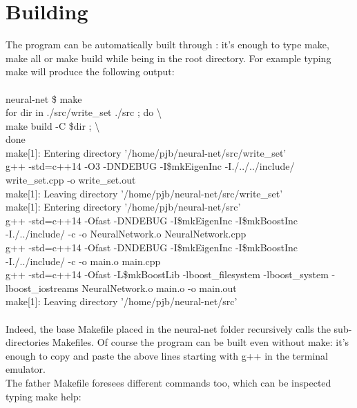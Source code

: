 \documentclass[12pt, a4paper]{report}
\theoremstyle{definition}
\begin{document}
\section{Building}
The program can be automatically built through \cite{make}: it's enough to type {\ttfamily make}, {\ttfamily make all} or {\ttfamily make build} while being in the root directory. For example typing {\ttfamily make} will produce the following output:\\
{\\ \ttfamily 
	neural-net \$ make \\
	for dir in ./src/write\_set ./src ; do \textbackslash\\
	  make build -C \$dir ; \textbackslash\\
	  done\\
	make[1]: Entering directory '/home/pjb/neural-net/src/write\_set'\\
	g++ -std=c++14 -O3 -DNDEBUG -I\$mkEigenInc -I./../../include/\\ write\_set.cpp -o write\_set.out\\
	make[1]: Leaving directory '/home/pjb/neural-net/src/write\_set'\\
	make[1]: Entering directory '/home/pjb/neural-net/src'\\
	g++ -std=c++14 -Ofast -DNDEBUG -I\$mkEigenInc -I\$mkBoostInc\\ -I./../include/  -c -o NeuralNetwork.o NeuralNetwork.cpp\\
	g++ -std=c++14 -Ofast -DNDEBUG -I\$mkEigenInc -I\$mkBoostInc\\ -I./../include/  -c -o main.o main.cpp\\
	g++ -std=c++14 -Ofast -L\$mkBoostLib -lboost\_filesystem -lboost\_system -lboost\_iostreams NeuralNetwork.o main.o -o main.out\\
	make[1]: Leaving directory '/home/pjb/neural-net/src'\\
	\\}
Indeed, the base Makefile placed in the neural-net folder recursively calls the sub-directories Makefiles. Of course the program can be built even without make: it's enough to copy and paste the above lines starting with {\ttfamily g++} in the terminal emulator.\\
The father Makefile foresees different commands too, which can be inspected typing {\ttfamily make help}:\\
\end{document}
